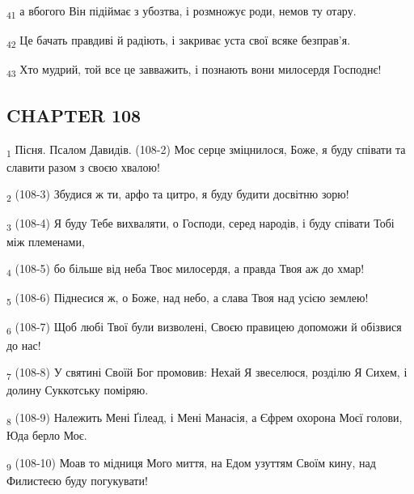 \begin{tcolorbox}
\textsubscript{41} а вбогого Він підіймає з убозтва, і розмножує роди, немов ту отару.
\end{tcolorbox}
\begin{tcolorbox}
\textsubscript{42} Це бачать правдиві й радіють, і закриває уста свої всяке безправ'я.
\end{tcolorbox}
\begin{tcolorbox}
\textsubscript{43} Хто мудрий, той все це завважить, і познають вони милосердя Господнє!
\end{tcolorbox}
\subsection{CHAPTER 108}
\begin{tcolorbox}
\textsubscript{1} Пісня. Псалом Давидів. (108-2) Моє серце зміцнилося, Боже, я буду співати та славити разом з своєю хвалою!
\end{tcolorbox}
\begin{tcolorbox}
\textsubscript{2} (108-3) Збудися ж ти, арфо та цитро, я буду будити досвітню зорю!
\end{tcolorbox}
\begin{tcolorbox}
\textsubscript{3} (108-4) Я буду Тебе вихваляти, о Господи, серед народів, і буду співати Тобі між племенами,
\end{tcolorbox}
\begin{tcolorbox}
\textsubscript{4} (108-5) бо більше від неба Твоє милосердя, а правда Твоя аж до хмар!
\end{tcolorbox}
\begin{tcolorbox}
\textsubscript{5} (108-6) Піднесися ж, о Боже, над небо, а слава Твоя над усією землею!
\end{tcolorbox}
\begin{tcolorbox}
\textsubscript{6} (108-7) Щоб любі Твої були визволені, Своєю правицею допоможи й обізвися до нас!
\end{tcolorbox}
\begin{tcolorbox}
\textsubscript{7} (108-8) У святині Своїй Бог промовив: Нехай Я звеселюся, розділю Я Сихем, і долину Суккотську поміряю.
\end{tcolorbox}
\begin{tcolorbox}
\textsubscript{8} (108-9) Належить Мені Ґілеад, і Мені Манасія, а Єфрем охорона Моєї голови, Юда берло Моє.
\end{tcolorbox}
\begin{tcolorbox}
\textsubscript{9} (108-10) Моав то мідниця Мого миття, на Едом узуттям Своїм кину, над Филистеєю буду погукувати!
\end{tcolorbox}
